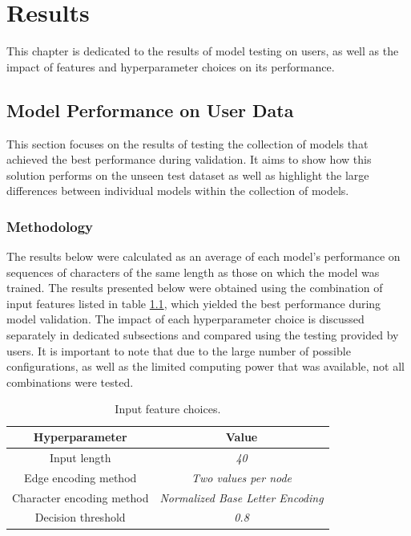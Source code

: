 \chapter{Results}
This chapter is dedicated to the results of model testing on users, as well as the impact of features and hyperparameter choices on its performance.

\section{Model Performance on User Data}
This section focuses on the results of testing the collection of models that achieved the best performance during validation. It aims to show how this solution performs on the unseen test dataset as well as highlight the large differences between individual models within the collection of models.

\subsection{Methodology}
The results below were calculated as an average of each model's performance on sequences of characters of the same length as those on which the model was trained.
The results presented below were obtained using the combination of input features listed in table \ref{table:hyperparams}, which yielded the best performance during model validation. The impact of each hyperparameter choice is discussed separately in dedicated subsections and compared using the testing provided by users. It is important to note that due to the large number of possible configurations, as well as the limited computing power that was available, not all combinations were tested.

\begin{center}
	\begin{table}[H]
		
\begin{center}
	\begin{tabular}{ |c|c|} 
		\hline
		Hyperparameter & Value \\
		\hline
		Input length & \textit{40} \\ 
		\hline
		Edge encoding method & \textit{Two values per node} \\		
		\hline 
		Character encoding method & \textit{Normalized Base Letter Encoding} \\		 
		\hline
		Decision threshold & \textit{0.8} \\
		\hline
	\end{tabular}
\end{center}
	\caption{Input feature choices.}
	\label{table:hyperparams}
	\end{table}
\end{center}


